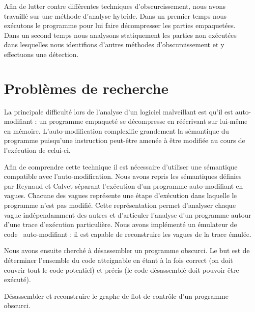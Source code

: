 Afin de lutter contre différentes techniques d'obscurcissement, nous avons travaillé sur une méthode d'analyse hybride.
Dans un premier temps nous exécutons le programme pour lui faire décompresser les parties empaquetées. Dans un second temps nous analysons statiquement les parties non exécutées dans lesquelles nous identifions d'autres méthodes d'obscurcissement et y effectuons une détection.

\section*{Problèmes de recherche}
La principale difficulté lors de l'analyse d'un logiciel malveillant est qu'il est auto-modifiant : un programme empaqueté se décompresse en réécrivant sur lui-même en mémoire. L'auto-modification complexifie grandement la sémantique du programme puisqu'une instruction peut-être amenée à être modifiée au cours de l'exécution de celui-ci.


Afin de comprendre cette technique il est nécessaire d'utiliser une sémantique compatible avec l'auto-modification.
Nous avons repris les sémantiques définies par Reynaud \cite{Reynaud2010} et Calvet \cite{Calvet2013} séparant l'exécution d'un programme auto-modifiant en vagues. Chacune des vagues représente une étape d'exécution dans laquelle le programme n'est pas modifié. Cette représentation permet d'analyser chaque vague indépendamment des autres et d'articuler l'analyse d'un programme autour d'une trace d'exécution particulière.
Nous avons implémenté un émulateur de code \xq\ auto-modifiant : il est capable de reconstruire les vagues de la trace émulée.


Nous avons ensuite cherché à désassembler un programme obscurci. Le but est de déterminer l'ensemble du code atteignable en étant à la fois correct (on doit couvrir tout le code potentiel) et précis (le code désassemblé doit pouvoir être exécuté). 

\begin{pbb}
 Désassembler et reconstruire le graphe de flot de contrôle d'un programme obscurci.
\end{pbb}

